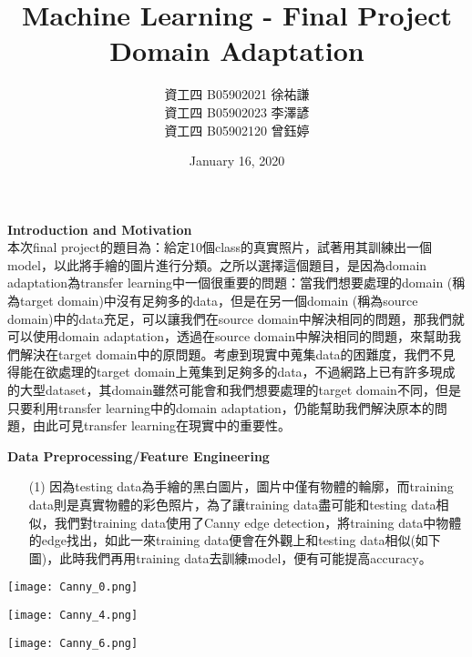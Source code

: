\documentclass{article}
\title{Machine Learning - Final Project\\{\Large Domain Adaptation}}
\author{資工四 B05902021 徐祐謙\\資工四 B05902023 李澤諺\\資工四 B05902120 曾鈺婷}
\date{January 16, 2020}
\begin{document}
\maketitle

\noindent
{\bf \LARGE Introduction and Motivation}\\

本次final project的題目為：給定10個class的真實照片，試著用其訓練出一個model，以此將手繪的圖片進行分類。之所以選擇這個題目，是因為domain adaptation為transfer learning中一個很重要的問題：當我們想要處理的domain (稱為target domain)中沒有足夠多的data，但是在另一個domain (稱為source domain)中的data充足，可以讓我們在source domain中解決相同的問題，那我們就可以使用domain adaptation，透過在source domain中解決相同的問題，來幫助我們解決在target domain中的原問題。考慮到現實中蒐集data的困難度，我們不見得能在欲處理的target domain上蒐集到足夠多的data，不過網路上已有許多現成的大型dataset，其domain雖然可能會和我們想要處理的target domain不同，但是只要利用transfer learning中的domain adaptation，仍能幫助我們解決原本的問題，由此可見transfer learning在現實中的重要性。\\

\bigskip

\noindent
{\bf \LARGE Data Preprocessing/Feature Engineering}\\

\begin{enumerate}
    \item[(1)] 因為testing data為手繪的黑白圖片，圖片中僅有物體的輪廓，而training data則是真實物體的彩色照片，為了讓training data盡可能和testing data相似，我們對training data使用了Canny edge detection，將training data中物體的edge找出，如此一來training data便會在外觀上和testing data相似(如下圖)，此時我們再用training data去訓練model，便有可能提高accuracy。\\
\end{enumerate}

\begin{center}
    \texttt{[image: Canny\_0.png]}
\end{center}
\begin{center}
    \texttt{[image: Canny\_4.png]}
\end{center}
\begin{center}
    \texttt{[image: Canny\_6.png]}
\end{center}
\end{document}
